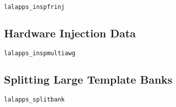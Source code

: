 \texttt{lalapps\_inspfrinj}

\subsection{Hardware Injection Data}

\texttt{lalapps\_inspmultiawg}

\subsection{Splitting Large Template Banks}

\texttt{lalapps\_splitbank}

\clearpage


\clearpage


\clearpage


\clearpage


\clearpage


\clearpage


\clearpage


\clearpage


\clearpage


%
%
